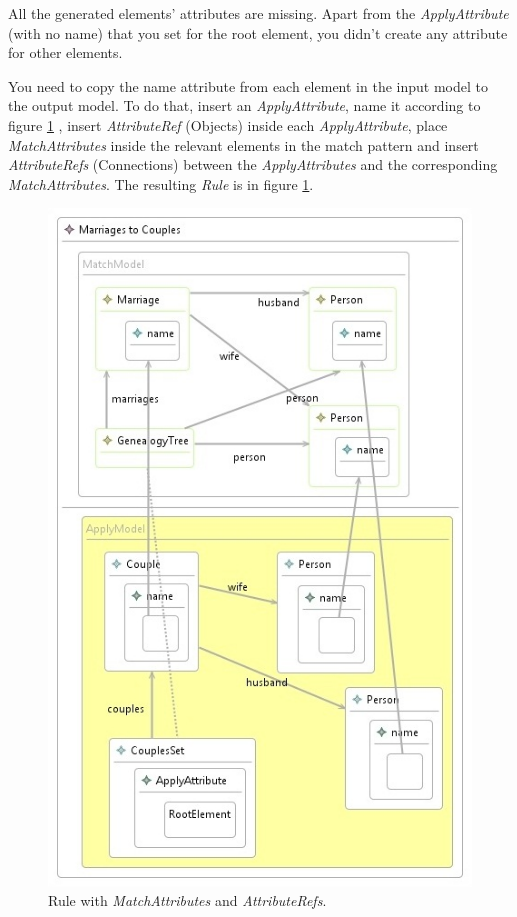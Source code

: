 All the generated elements' attributes are missing. Apart from the
\emph{ApplyAttribute} (with no name) that you set for the root element, you
didn't create any attribute for other elements.

You need to copy the name attribute from each element in the input model to
the output model. To do that, insert an \emph{ApplyAttribute}, name it according to
figure \ref{fig:rule_with_attrs_ref} , insert \emph{AttributeRef} (Objects)
inside each \emph{ApplyAttribute}, place \emph{MatchAttributes} inside the relevant elements
in the match pattern and insert \emph{AttributeRefs} (Connections) between the
\emph{ApplyAttributes} and the corresponding \emph{MatchAttributes}. The
resulting \emph{Rule} is in figure \ref{fig:rule_with_attrs_ref}.

\begin{figure}[h]
\begin{center}
  \includegraphics[scale=0.7]{imgs/rule_with_attrs_ref.jpeg}
  \caption{Rule with \emph{MatchAttributes} and \emph{AttributeRefs}.}
  \label{fig:rule_with_attrs_ref}
\end{center}
\end{figure}

